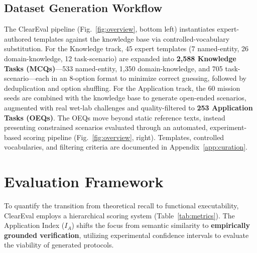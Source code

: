 \documentclass[conference]{IEEEtran}
\begin{document}
\subsection{Dataset Generation Workflow}
The ClearEval pipeline (Fig.~\ref{fig:overview}, bottom left) instantiates
expert-authored templates against the knowledge base via controlled-vocabulary
substitution. For the Knowledge track, 45 expert templates (7 named-entity, 26
domain-knowledge, 12 task-scenario) are expanded into \textbf{2{,}588 Knowledge
Tasks (MCQs)}---533 named-entity, 1{,}350 domain-knowledge, and 705
task-scenario---each in an 8-option format to minimize correct guessing,
followed by deduplication and option shuffling. For the Application track, the
60 mission seeds are combined with the knowledge base to generate open-ended
scenarios, augmented with real wet-lab challenges and quality-filtered to
\textbf{253 Application Tasks (OEQs)}. The OEQs move beyond static reference
texts, instead presenting constrained scenarios evaluated through an automated,
experiment-based scoring pipeline (Fig.~\ref{fig:overview}, right). Templates,
controlled vocabularies, and filtering criteria are documented in
Appendix~\ref{app:curation}.

\section{Evaluation Framework}
To quantify the transition from theoretical recall to functional
executability, ClearEval employs a hierarchical scoring system
(Table~\ref{tab:metrics}). The Application Index ($I_A$) shifts the focus from
semantic similarity to \textbf{empirically grounded verification}, utilizing
experimental confidence intervals to evaluate the viability of generated
protocols.
\end{document}
